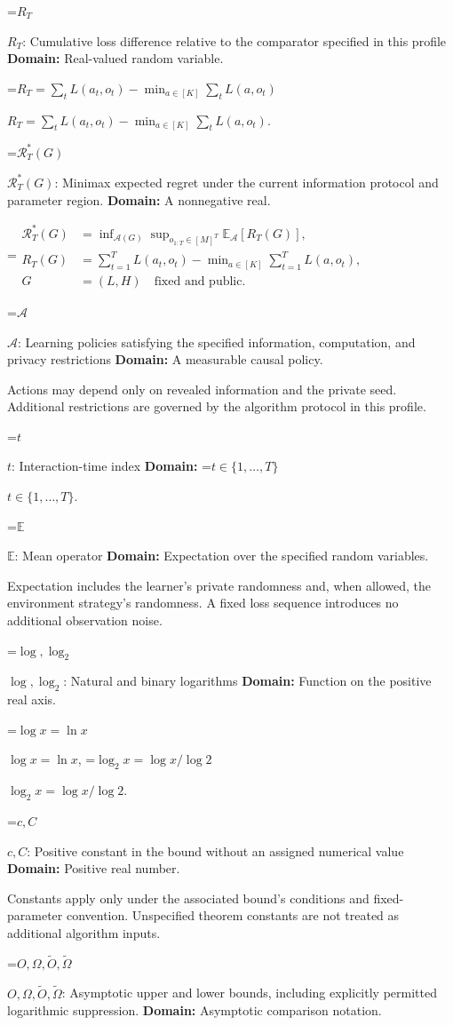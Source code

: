 \documentclass[10pt,a4paper]{article}
\newcommand{\AtlasMath}[1]{\par\begingroup\centering\setbox0=\hbox{$\displaystyle #1$}\ifdim\wd0>1.4\linewidth\typeout{ATLAS WIDE FORMULA: \the\wd0}\fi\ifdim\wd0>\linewidth\resizebox{\linewidth}{!}{\box0}\else\box0\fi\par\endgroup}
\newcommand{\AtlasInlineMath}[1]{\begingroup\setbox0=\hbox{$#1$}\ifdim\wd0>.4\linewidth\endgroup\AtlasMath{#1}\else\endgroup$#1$\fi}
\begin{document}
\AtlasInlineMath{R_T}: Cumulative loss difference relative to the comparator specified in this profile \textbf{Domain:} Real-valued random variable.

\AtlasInlineMath{R_T=\sum_tL(a_t,o_t)-\min_{a\in[K]}\sum_tL(a,o_t)}.

\AtlasInlineMath{\mathcal R_T^*(G)}: Minimax expected regret under the current information protocol and parameter region. \textbf{Domain:} A nonnegative real.


\AtlasMath{\begin{aligned}\mathcal R_T^*(G)&=\inf_{\mathcal A(G)}\sup_{o_{1:T}\in[M]^T}\mathbb E_{\mathcal A}[R_T(G)],\\ R_T(G)&=\sum_{t=1}^T L(a_t,o_t)-\min_{a\in[K]}\sum_{t=1}^T L(a,o_t),\\ G&=(L,H)\quad\text{fixed and public}.\end{aligned}}


\AtlasInlineMath{\mathcal A}: Learning policies satisfying the specified information, computation, and privacy restrictions \textbf{Domain:} A measurable causal policy.

Actions may depend only on revealed information and the private seed. Additional restrictions are governed by the algorithm protocol in this profile.

\AtlasInlineMath{t}: Interaction-time index \textbf{Domain:} \AtlasInlineMath{t\in\{1,\ldots,T\}}.

\AtlasInlineMath{\mathbb E}: Mean operator \textbf{Domain:} Expectation over the specified random variables.

Expectation includes the learner's private randomness and, when allowed, the environment strategy's randomness. A fixed loss sequence introduces no additional observation noise.

\AtlasInlineMath{\log,\log_2}: Natural and binary logarithms \textbf{Domain:} Function on the positive real axis.

\AtlasInlineMath{\log x=\ln x}, \AtlasInlineMath{\log_2x=\log x/\log2}.

\AtlasInlineMath{c,C}: Positive constant in the bound without an assigned numerical value \textbf{Domain:} Positive real number.

Constants apply only under the associated bound’s conditions and fixed-parameter convention. Unspecified theorem constants are not treated as additional algorithm inputs.

\AtlasInlineMath{O,\Omega,\widetilde O,\widetilde\Omega}: Asymptotic upper and lower bounds, including explicitly permitted logarithmic suppression. \textbf{Domain:} Asymptotic comparison notation.
\end{document}
